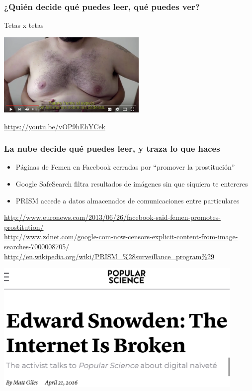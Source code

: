 \documentclass[17pt,aspectratio=169,hyperref=pdfusetitle]{beamer}
\begin{document}

\begin{frame}
\frametitle{¿Quién decide qué puedes leer, qué puedes ver?}

  Tetas x tetas

\begin{center}
\includegraphics[height=4cm]{figs/tetasxtetas}
\end{center}

{\tiny \url{https://youtu.be/vOP9hEhYCek}}
\end{frame}



\begin{frame}
\frametitle{La nube decide qué puedes leer, y traza lo que haces}

\begin{itemize}
\item Páginas de Femen en Facebook cerradas por ``promover la prostitución''
\item Google SafeSearch filtra resultados de imágenes sin que siquiera te entereres
\item PRISM accede a datos almacenados de comunicaciones entre particulares
\end{itemize}
{\tiny
  \url{http://www.euronews.com/2013/06/26/facebook-said-femen-promotes-prostitution/}\\
  \url{http://www.zdnet.com/google-com-now-censors-explicit-content-from-image-searches-7000008705/}\\
  \url{http://en.wikipedia.org/wiki/PRISM_\%28surveillance_program\%29}\\
}
\end{frame}

\begin{frame}[fragile]

  \begin{center}
  \includegraphics[width=12cm]{figs/snowden-internet}
  \end{center}

\end{frame}
\end{document}
